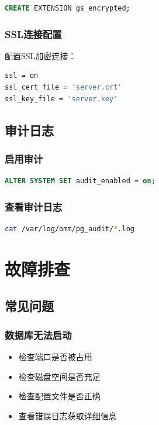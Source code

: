 \documentclass[12pt,UTF8]{ctexbook}
\begin{document}
\begin{lstlisting}[language=sql, caption=启用透明数据加密]
CREATE EXTENSION gs_encrypted;
\end{lstlisting}

\subsection{SSL连接配置}

配置SSL加密连接：

\begin{lstlisting}[language=bash, caption=配置SSL]
ssl = on
ssl_cert_file = 'server.crt'
ssl_key_file = 'server.key'
\end{lstlisting}

\section{审计日志}

\subsection{启用审计}

\begin{lstlisting}[language=sql, caption=启用审计功能]
ALTER SYSTEM SET audit_enabled = on;
\end{lstlisting}

\subsection{查看审计日志}

\begin{lstlisting}[language=bash, caption=查看审计日志]
cat /var/log/omm/pg_audit/*.log
\end{lstlisting}

\chapter{故障排查}

\section{常见问题}

\subsection{数据库无法启动}

\begin{itemize}[leftmargin=2cm]
    \item 检查端口是否被占用
    \item 检查磁盘空间是否充足
    \item 检查配置文件是否正确
    \item 查看错误日志获取详细信息
\end{itemize}
\end{document}
